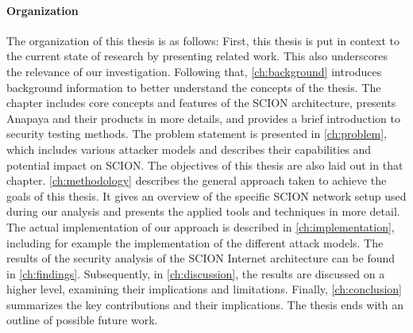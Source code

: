 

\paragraph{Organization}
\label{sec:intro:organization}

The organization of this thesis is as follows:
First, this thesis is put in context to the current state of research by presenting related work.
This also underscores the relevance of our investigation.
Following that, \cref{ch:background} introduces background information to better understand the concepts of the thesis.
The chapter includes core concepts and features of the SCION architecture, presents Anapaya and their products in more details, and provides a brief introduction to security testing methods.
The problem statement is presented in \cref{ch:problem}, which includes various attacker models and describes their capabilities and potential impact on SCION.
The objectives of this thesis are also laid out in that chapter.
\cref{ch:methodology} describes the general approach taken to achieve the goals of this thesis.
It gives an overview of the specific SCION network setup used during our analysis and presents the applied tools and techniques in more detail.
The actual implementation of our approach is described in \cref{ch:implementation}, including for example the implementation of the different attack models.
The results of the security analysis of the SCION Internet architecture can be found in \cref{ch:findings}.
Subsequently, in \cref{ch:discussion}, the results are discussed on a higher level, examining their implications and limitations.
Finally, \cref{ch:conclusion} summarizes the key contributions and their implications.
The thesis ends with an outline of possible future work.

